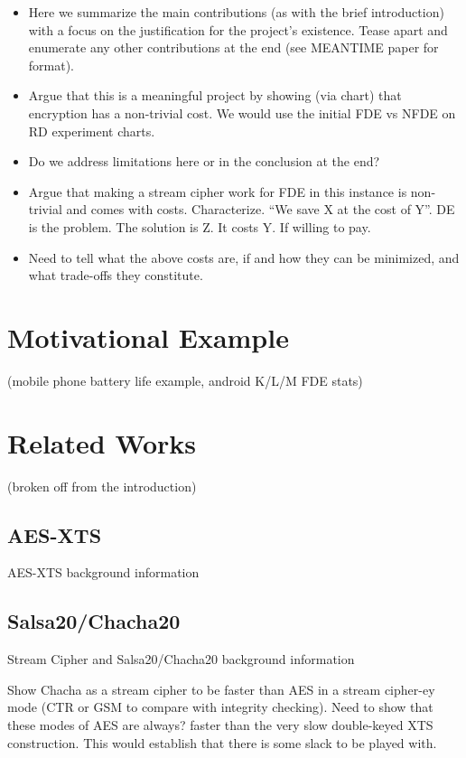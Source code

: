 \documentclass[letterpaper,twocolumn,10pt]{article}
\begin{document}
\begin{itemize}
  \item Here we summarize the main contributions (as with the brief introduction) with a focus on the justification for
  the project's existence. Tease apart and enumerate any other contributions at the end (see MEANTIME paper for format).
  \item Argue that this is a meaningful project by showing (via chart) that encryption has a non-trivial cost. We would 
  use the initial FDE vs  NFDE on RD experiment charts.
  \item Do we address limitations here or in the conclusion at the end?
  \item Argue that making a stream cipher work for FDE in this instance is non-trivial and comes with costs. Characterize.
  ``We save X at the cost of Y''. DE is the problem. The solution is Z. It costs Y. If willing to pay.
  \item Need to tell what the above costs are, if and how they can be minimized, and what trade-offs they constitute.
\end{itemize}

\section{Motivational Example}
(mobile phone battery life example, android K/L/M FDE stats)

\section{Related Works}
(broken off from the introduction)

\subsection{AES-XTS}
AES-XTS background information

\subsection{Salsa20/Chacha20}
Stream Cipher and Salsa20/Chacha20 background information

Show Chacha as a stream cipher to be faster than AES in a stream cipher-ey mode (CTR or GSM to compare with integrity
checking). Need to show that these modes of AES are always? faster than the very slow double-keyed XTS construction.
This would establish that there is some slack to be played with.
\end{document}
